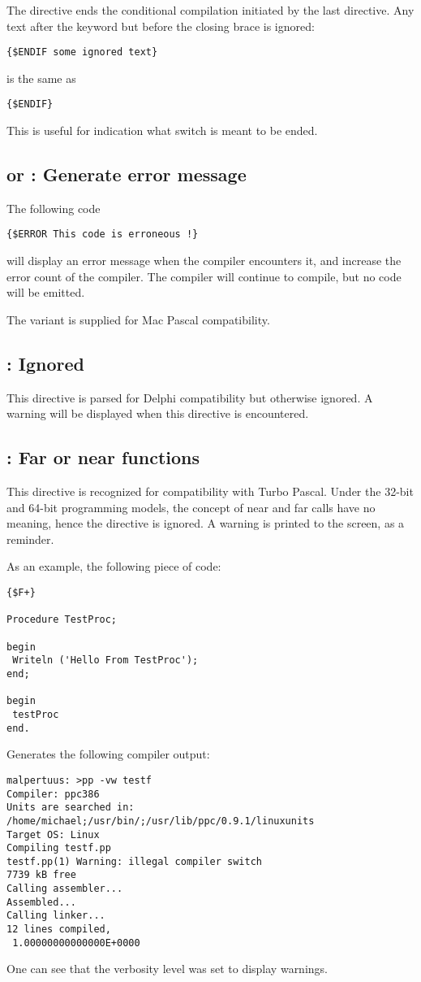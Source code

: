 The  directive ends the conditional compilation initiated by the
last  directive. Any text after the  keyword but
before the closing brace is ignored:
\begin{verbatim}
{$ENDIF some ignored text}
\end{verbatim}
is the same as
\begin{verbatim}
{$ENDIF}
\end{verbatim}
This is useful for indication what switch is meant to be ended.

\subsection{ or  : Generate error message}

The following code
\begin{verbatim}
{$ERROR This code is erroneous !}
\end{verbatim}
will display an error message when the compiler encounters it,
and increase the error count of the compiler.
The compiler will continue to compile, but no code will be emitted.

The  variant is supplied for Mac Pascal compatibility.

\subsection{: Ignored}
This directive is parsed for Delphi compatibility but otherwise ignored. A
warning will be displayed when this directive is encountered.

\subsection{ : Far or near functions}
This directive is recognized for compatibility with Turbo Pascal. Under the
32-bit and 64-bit programming models, the concept of near and far calls have
no meaning, hence the directive is ignored. A warning is printed to the screen, 
as a reminder.

As an example, the following piece of code:
\begin{verbatim}
{$F+}

Procedure TestProc;

begin
 Writeln ('Hello From TestProc');
end;

begin
 testProc
end.
\end{verbatim}
Generates the following compiler output:
\begin{verbatim}
malpertuus: >pp -vw testf
Compiler: ppc386
Units are searched in: /home/michael;/usr/bin/;/usr/lib/ppc/0.9.1/linuxunits
Target OS: Linux
Compiling testf.pp
testf.pp(1) Warning: illegal compiler switch
7739 kB free
Calling assembler...
Assembled...
Calling linker...
12 lines compiled,
 1.00000000000000E+0000
\end{verbatim}
One can see that the verbosity level was set to display warnings.

